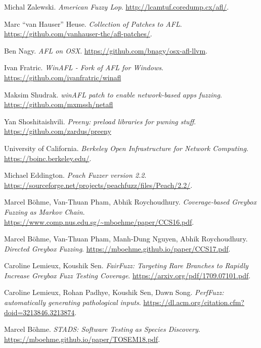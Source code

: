 \begin{thebibliography}{99} %

  Michal Zalewski. %
  \textit{American Fuzzy Lop}. %
  \url{http://lcamtuf.coredump.cx/afl/}. %

  Marc ``van Hauser'' Heuse.
  \textit{Collection of Patches to AFL}.
  \url{https://github.com/vanhauser-thc/afl-patches/}.

  Ben Nagy.
  \textit{AFL on OSX}.
  \url{https://github.com/bnagy/osx-afl-llvm}.

  Ivan Fratric.
  \textit{WinAFL - Fork of AFL for Windows}.
  \url{https://github.com/ivanfratric/winafl}

  Maksim Shudrak.
  \textit{winAFL patch to enable network-based apps fuzzing}.
  \url{https://github.com/mxmssh/netafl}

  Yan Shoshitaishvili.
  \textit{Preeny: preload libraries for pwning stuff}.
  \url{https://github.com/zardus/preeny}

  University of California.
  \textit{Berkeley Open Infrastructure for Network Computing}.
  \url{https://boinc.berkeley.edu/}.

  Michael Eddington.
  \textit{Peach Fuzzer version 2.2}.
  \url{https://sourceforge.net/projects/peachfuzz/files/Peach/2.2/}.

  Marcel B\"ohme, Van-Thuan Pham, Abhik Roychoudhury.
  \textit{Coverage-based Greybox Fuzzing as Markov Chain}.
  \url{https://www.comp.nus.edu.sg/~mboehme/paper/CCS16.pdf}.

  Marcel B\"ohme, Van-Thuan Pham, Manh-Dung Nguyen, Abhik Roychoudhury.
  \textit{Directed Greybox Fuzzing}.
  \url{https://mboehme.github.io/paper/CCS17.pdf}.

  Caroline Lemieux, Koushik Sen.
  \textit{FairFuzz: Targeting Rare Branches to Rapidly Increase Greybox Fuzz Testing Coverage}.
  \url{https://arxiv.org/pdf/1709.07101.pdf}.

  Caroline Lemieux, Rohan Padhye, Koushik Sen, Dawn Song.
  \textit{PerfFuzz: automatically generating pathological inputs}.
  \url{https://dl.acm.org/citation.cfm?doid=3213846.3213874}.

  Marcel B\"ohme.
  \textit{STADS: Software Testing as Species Discovery}.
  \url{https://mboehme.github.io/paper/TOSEM18.pdf}.


\end{thebibliography}

